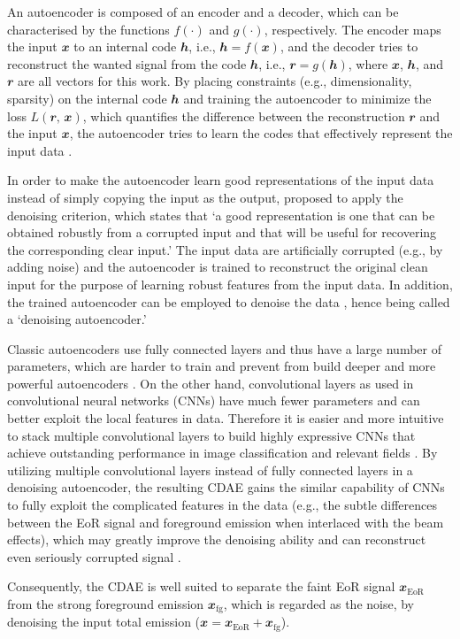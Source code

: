 \documentclass[fleqn,usenatbib]{mnras}
\newcommand{\R}[1]{\mathrm{#1}}
\newcommand{\B}[1]{\mathbfit{#1}}
\newcommand{\editwip}[1]{{\leavevmode\color{magenta}#1}}
\begin{document}
An autoencoder is composed of an encoder and a decoder, which can be
characterised by the functions $f(\cdot)$ and $g(\cdot)$, respectively.
The encoder maps the input $\B{x}$ to an internal code $\B{h}$, i.e.,
$\B{h} = f(\B{x})$, and the decoder tries to reconstruct the wanted
signal from the code $\B{h}$, i.e., $\B{r} = g(\B{h})$, where $\B{x}$,
$\B{h}$, and $\B{r}$ are all vectors for this work.
By placing constraints (e.g., dimensionality, sparsity) on the
internal code $\B{h}$ and training the autoencoder to minimize the
loss $L(\B{r}, \, \B{x})$, which quantifies the difference between the
reconstruction $\B{r}$ and the input $\B{x}$, the autoencoder tries to
learn the codes that effectively represent the input data
\citep[e.g.,][chapter 14]{goodfellow2016}.

\editwip{%
In order to make the autoencoder learn good representations of the input
data instead of simply copying the input as the output,
\citet{vincent2008,vincent2010} proposed to apply the denoising criterion,
which states that `a good representation is one that can be obtained
robustly from a corrupted input and that will be useful for recovering the
corresponding clear input.'
The input data are artificially corrupted (e.g., by adding noise) and the
autoencoder is trained to reconstruct the original clean input for the
purpose of learning robust features from the input data.
In addition, the trained autoencoder can be employed to denoise the data
\citep[e.g.,][]{xie2012,gondara2016}, hence being called a `denoising
autoencoder.'

Classic autoencoders use fully connected layers and thus have a large
number of parameters, which are harder to train and prevent from build
deeper and more powerful autoencoders
\citep[e.g.,][]{glorot2010,larochelle2009}.
On the other hand, convolutional layers as used in convolutional neural
networks (CNNs) have much fewer parameters and can better exploit the local
features in data.  Therefore it is easier and more intuitive to stack
multiple convolutional layers to build highly expressive CNNs that achieve
outstanding performance in image classification and relevant fields
\citep[e.g.,][]{krizhevsky2012,simonyan2014,szegedy2015}.
By utilizing multiple convolutional layers instead of fully connected
layers in a denoising autoencoder, the resulting CDAE gains the similar
capability of CNNs to fully exploit the complicated features in the data
(e.g., the subtle differences between the EoR signal and foreground
emission when interlaced with the beam effects), which may greatly improve
the denoising ability and can reconstruct even seriously corrupted signal
\citep{du2017}.}  %
Consequently, the CDAE is well suited to separate the faint EoR signal
$\B{x}_{\R{EoR}}$ from the strong foreground emission $\B{x}_{\R{fg}}$,
which is regarded as the noise, by denoising the input total emission
($\B{x} = \B{x}_{\R{EoR}} + \B{x}_{\R{fg}}$).
\end{document}
